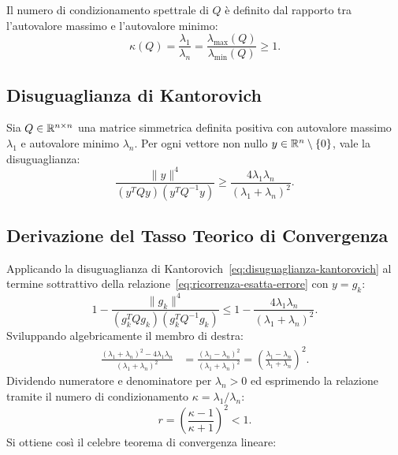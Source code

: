 \begin{definition}
Il numero di condizionamento spettrale di $Q$ \`e definito dal rapporto tra l'autovalore massimo e l'autovalore minimo:
\begin{equation}
    \kappa(Q) = \frac{\lambda_1}{\lambda_n} = \frac{\lambda_{\max}(Q)}{\lambda_{\min}(Q)} \ge 1.
\end{equation}
\end{definition}

\subsection{Disuguaglianza di Kantorovich}

\begin{theorem}
\label{thm:kantorovich}
Sia $Q \in \mathbb{R}^{n \times n}$ una matrice simmetrica definita positiva con autovalore massimo $\lambda_1$ e autovalore minimo $\lambda_n$. Per ogni vettore non nullo $y \in \mathbb{R}^n \setminus \{0\}$, vale la disuguaglianza:
\begin{equation}
    \frac{\|y\|^4}{(y^T Q y)(y^T Q^{-1} y)} \ge \frac{4 \lambda_1 \lambda_n}{(\lambda_1 + \lambda_n)^2}.
    \label{eq:disuguaglianza-kantorovich}
\end{equation}
\end{theorem}

\subsection{Derivazione del Tasso Teorico di Convergenza}
Applicando la disuguaglianza di Kantorovich~\eqref{eq:disuguaglianza-kantorovich} al termine sottrattivo della relazione~\eqref{eq:ricorrenza-esatta-errore} con $y = g_k$:
\begin{equation}
    1 - \frac{\|g_k\|^4}{(g_k^T Q g_k)(g_k^T Q^{-1} g_k)} \le 1 - \frac{4 \lambda_1 \lambda_n}{(\lambda_1 + \lambda_n)^2}.
\end{equation}
Sviluppando algebricamente il membro di destra:
\begin{align}
    \frac{(\lambda_1 + \lambda_n)^2 - 4 \lambda_1 \lambda_n}{(\lambda_1 + \lambda_n)^2} &= \frac{(\lambda_1 - \lambda_n)^2}{(\lambda_1 + \lambda_n)^2} = \left( \frac{\lambda_1 - \lambda_n}{\lambda_1 + \lambda_n} \right)^2.
\end{align}
Dividendo numeratore e denominatore per $\lambda_n > 0$ ed esprimendo la relazione tramite il numero di condizionamento $\kappa = \lambda_1 / \lambda_n$:
\begin{equation}
    r = \left( \frac{\kappa - 1}{\kappa + 1} \right)^2 < 1.
    \label{eq:tasso-kantorovich}
\end{equation}
Si ottiene cos\`i il celebre teorema di convergenza lineare:

